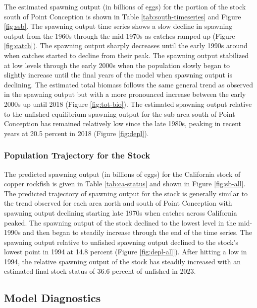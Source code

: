 \documentclass[11pt,
  english,
  letterpaper,
]{article}
\begin{document}
The estimated spawning output (in billions of eggs) for the portion of the stock south of Point Conception is shown in Table \ref{tab:south-timeseries} and Figure \ref{fig:ssb}. The spawning output time series shows a slow decline in spawning output from the 1960s through the mid-1970s as catches ramped up (Figure \ref{fig:catch}). The spawning output sharply decreases until the early 1990s around when catches started to decline from their peak. The spawning output stabilized at low levels through the early 2000s when the population slowly began to slightly increase until the final years of the model when spawning output is declining. The estimated total biomass follows the same general trend as observed in the spawning output but with a more pronounced increase between the early 2000s up until 2018 (Figure \ref{fig:tot-bio}). The estimated spawning output relative to the unfished equilibrium spawning output for the sub-area south of Point Conception has remained relatively low since the late 1980s, peaking in recent years at 20.5 percent in 2018 (Figure \ref{fig:depl}).

\hypertarget{population-trajectory-for-the-stock}{%
\subsubsection{Population Trajectory for the Stock}\label{population-trajectory-for-the-stock}}

The predicted spawning output (in billions of eggs) for the California stock of copper rockfish is given in Table \ref{tab:ca-status} and shown in Figure \ref{fig:sb-all}. The predicted trajectory of spawning output for the stock is generally similar to the trend observed for each area north and south of Point Conception with spawning output declining starting late 1970s when catches across California peaked. The spawning output of the stock declined to the lowest level in the mid-1990s and then began to steadily increase through the end of the time series. The spawning output relative to unfished spawning output declined to the stock's lowest point in 1994 at 14.8 percent (Figure \ref{fig:depl-all}). After hitting a low in 1994, the relative spawning output of the stock has steadily increased with an estimated final stock status of 36.6 percent of unfished in 2023.

\hypertarget{model-diagnostics}{%
\subsection{Model Diagnostics}\label{model-diagnostics}}
\end{document}

